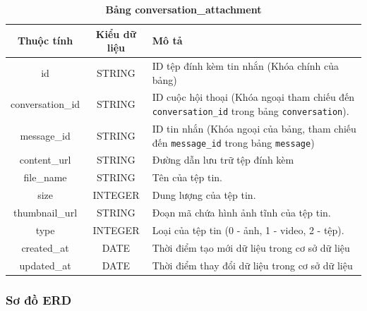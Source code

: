 \begin{table}[H]
  \caption{\bfseries \fontsize{12pt}{0pt}\selectfont Bảng conversation\_attachment}
  \centering
  \begin{tabularx}{0.9\textwidth}{|c|c|X|}
    \hline
    \textbf{Thuộc tính} & \textbf{Kiểu dữ liệu} & \textbf{Mô tả} \\
    \hline
    id & STRING & ID tệp đính kèm tin nhắn (Khóa chính của bảng) \\
    \hline
    conversation\_id & STRING & ID cuộc hội thoại (Khóa ngoại tham chiếu đến \texttt{conversation\_id} trong bảng \texttt{conversation}). \\
    \hline
    message\_id & STRING & ID tin nhắn (Khóa ngoại của bảng, tham chiếu đến \texttt{message\_id} trong bảng \texttt{message}) \\
    \hline
    content\_url & STRING & Đường dẫn lưu trữ tệp đính kèm\\
    \hline
    file\_name & STRING & Tên của tệp tin.\\
    \hline
    size & INTEGER & Dung lượng của tệp tin.\\
    \hline
    thumbnail\_url & STRING & Đoạn mã chứa hình ảnh tĩnh của tệp tin.\\
    \hline
    type & INTEGER & Loại của tệp tin (0 - ảnh, 1 - video, 2 - tệp). \\
    \hline
    created\_at & DATE & Thời điểm tạo mới dữ liệu trong cơ sở dữ liệu \\
    \hline
    updated\_at & DATE & Thời điểm thay đổi dữ liệu trong cơ sở dữ liệu \\
    \hline
  \end{tabularx}
\end{table}

\subsubsection{Sơ đồ ERD}

